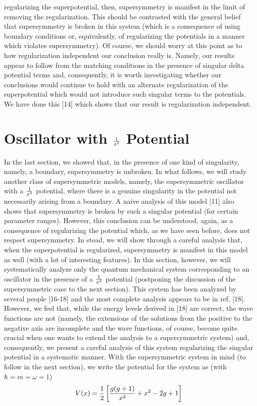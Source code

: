 \documentclass[a4paper,11pt]{article}
\begin{document}
regularizing the superpotential, then, supersymmetry is manifest in
the limit of removing the regularization. This should be  contrasted
with  the general belief that supersymmetry is broken in this system
(which is a consequence of using boundary conditions or, equivalently,
of regularizing the potentials in a manner which violates
supersymmetry).
Of course, we should worry at this point as to how regularization
independent our conclusion really is. Namely, our results appear to
follow from the matching conditions in the presence of singular delta
potential terms and, consequently, it is worth investigating whether
our conclusions would continue to hold with an alternate
regularization of the superpotential which would not introduce such
singular terms to the potentials. We have done this [14] which shows that
our result is regularization independent.

\section{Oscillator with ${1\over x^{2}}$ Potential}

In the last section, we showed that, in the presence of one kind of
singularity, namely, a boundary, supersymmetry is unbroken. In what
follows, we will study another class of supersymmetric models, namely,
the supersymmetric oscillator with a ${1\over x^{2}}$ potential, where
there is a genuine singularity in the potential not necessarily
arising  from a boundary. A naive analysis of this model [11] also
shows that supersymmetry is broken by such a singular potential (for
certain parameter ranges). However, this conclusion can be understood,
again, as a consequence of regularizing the potential
which, as we have seen before, does not respect supersymmetry. In
stead, we will show through a careful analysis that,
when the superpotential is regularized, supersymmetry is manifest in
this model as well (with a lot of interesting features).  
In this section, however, we will systematically analyze only the quantum
mechanical system corresponding to an oscillator in the presence of a
${1\over x^{2}}$ potential (postponing the discussion of the
supersymmetric  case to the next section). This system has been
analyzed  by several people [16-18]  and
the most complete analysis appears to be in ref. [18]. However, we feel
that, while the energy levels derived in [18] are correct, the wave
functions are not (namely, the extensions of the solutions from the
positive to the negative axis are incomplete and the wave functions,
of course, become quite crucial  when one
wants to extend the analysis to a supersymmetric system) and,
consequently, we  present a careful analysis of this system
regularizing the singular potential in a systematic manner. With the
supersymmetric system in mind (to follow in the next section), we
write the potential for the system as (with $\hbar=m=\omega=1$)
\begin{equation}
V(x) = {1\over 2}\left[\frac{g(g+1)}{x^{2}} + x^{2} - 2g +
1\right]\label{c1}
\end{equation}
\end{document}
